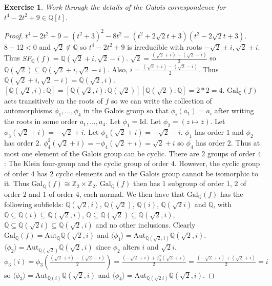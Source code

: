 \documentclass{article}
\newtheorem{exercise}[theorem]{Exercise}
\begin{document}
\begin{exercise}
Work through the details of the Galois correspondence for $t^4-2t^2+9\in\mathbb{Q}[t]$.
\end{exercise}
\begin{proof}
$t^4-2t^2+9=(t^2+3)^2-8t^2=(t^2+2\sqrt{2}t+3)(t^2-2\sqrt{2}t+3)$. $8-12<0$ and $\sqrt{2}\not\in\mathbb{Q}$ so $t^4-2t^2+9$ is irreducible with roots $-\sqrt{2}\pm i,\sqrt{2}\pm i$. Thus $SF_\mathbb{Q}(f)=\mathbb{Q}(\sqrt{2}+i,\sqrt{2}-i)$. $\sqrt{2}=\frac{(\sqrt{2}+i)+(\sqrt{2}-i)}{2}$ so $\mathbb{Q}(\sqrt{2})\subseteq\mathbb{Q}(\sqrt{2}+i,\sqrt{2}-i)$. Also, $i=\frac{(\sqrt{2}+i)-(\sqrt{2}-i)}{2}$. Thus $\mathbb{Q}(\sqrt{2}+i,\sqrt{2}-i)=\mathbb{Q}(\sqrt{2},i)$. $[\mathbb{Q}(\sqrt{2},i):\mathbb{Q}]=[\mathbb{Q}(\sqrt{2},i):\mathbb{Q}(\sqrt{2})][\mathbb{Q}(\sqrt{2}):\mathbb{Q}]=2*2=4$. $\text{Gal}_\mathbb{Q}(f)$ acts transitively on the roots of $f$ so we can write the collection of automorphisms $\phi_1,...,\phi_4$ in the Galois group so that $\phi_i(a_1)=a_i$ after writing the roots in some order $a_1,...,a_4$. Let $\phi_1=\text{Id}$. Let $\phi_2=(z\mapsto \overline{z})$. Let $\phi_3(\sqrt{2}+i)=-\sqrt{2}+i$. Let $\phi_4(\sqrt{2}+i)=-\sqrt{2}-i$. $\phi_1$ has order $1$ and $\phi_2$ has order $2$. $\phi_4^2(\sqrt{2}+i)=-\phi_4(\sqrt{2}+i)=\sqrt{2}+i$ so $\phi_4$ has order $2$. Thus at most one element of the Galois group can be cyclic. There are $2$ groups of order $4$: The Klein four-group and the cyclic group of order $4$. However, the cyclic group of order $4$ has $2$ cyclic elements and so the Galois group cannot be isomorphic to it. Thus $\text{Gal}_\mathbb{Q}(f)\cong\mathbb{Z}_2\times\mathbb{Z}_2$. $\text{Gal}_\mathbb{Q}(f)$ then has $1$ subgroup of order $1$, $2$ of order $2$ and $1$ of order $4$, each normal. We then have that $\text{Gal}_\mathbb{Q}(f)$ has the following subfields: $\mathbb{Q}(\sqrt{2},i)$, $\mathbb{Q}(\sqrt{2})$, $\mathbb{Q}(i)$, $\mathbb{Q}(\sqrt{2}i)$ and $\mathbb{Q}$, with $\mathbb{Q}\subseteq\mathbb{Q}(i)\subseteq\mathbb{Q}(\sqrt{2},i)$, $\mathbb{Q}\subseteq\mathbb{Q}(\sqrt{2})\subseteq\mathbb{Q}(\sqrt{2},i)$, $\mathbb{Q}\subseteq\mathbb{Q}(\sqrt{2}i)\subseteq\mathbb{Q}(\sqrt{2},i)$ and no other inclusions. Clearly $\text{Gal}_\mathbb{Q}(f)=\text{Aut}_\mathbb{Q}\mathbb{Q}(\sqrt{2},i)$ and $\langle\phi_1\rangle=\text{Aut}_{\mathbb{Q}(\sqrt{2},i)}\mathbb{Q}(\sqrt{2},i)$. $\langle \phi_2\rangle=\text{Aut}_{\mathbb{Q}(\sqrt{2})}\mathbb{Q}(\sqrt{2},i)$ since $\phi_2$ alters $i$ and $\sqrt{2}i$. $\phi_3(i)=\phi_3(\frac{(\sqrt{2}+i)-(\sqrt{2}-i)}{2})=\frac{(-\sqrt{2}+i)+\phi_3^2(\sqrt{2}+i)}{2}=\frac{(-\sqrt{2}+i)+(\sqrt{2}+i)}{2}=i$ so $\langle\phi_3\rangle=\text{Aut}_{\mathbb{Q}(i)}\mathbb{Q}(\sqrt{2},i)$ and $\langle\phi_4\rangle=\text{Aut}_{\mathbb{Q}(\sqrt{2}i)}\mathbb{Q}(\sqrt{2},i)$.
\end{proof}
\end{document}
